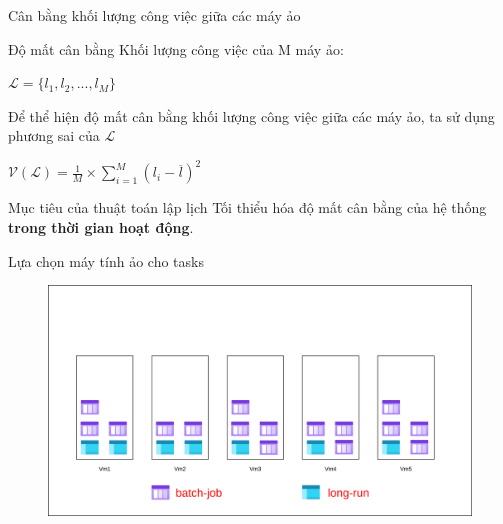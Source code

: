 \documentclass[11pt,xcolor={dvipsnames}, aspectratio=169]{beamer}
\begin{document}
\begin{frame}
{Cân bằng khối lượng công việc giữa các máy ảo}
\pause
\begin{block}
{Độ mất cân bằng}
Khối lượng công việc của M máy ảo: 
\begin{center}
	$\mathcal{L} = \{l_{1}, l_{2}, ..., l_{M}\}$
\end{center}
Để thể hiện độ mất cân bằng khối lượng công việc giữa các máy ảo, ta sử dụng phương sai của $\mathcal{L}$
\begin{center}
	$\mathcal{V}(\mathcal{L}) = \frac{1}{M} \times \sum_{i = 1}^{M}(l_{i} - \overline{l})^{2}$
\end{center}
\end{block}
\begin{block}
{Mục tiêu của thuật toán lập lịch}
Tối thiểu hóa độ mất cân bằng của hệ thống \textbf{trong thời gian hoạt động}.
\end{block}
\end{frame}

\begin{frame}
{Lựa chọn máy tính ảo cho tasks}
	\begin{figure}
		\vspace{1cm}
		\includegraphics[scale=0.4]{images/balancing_tasks1.png}
	\end{figure}
\end{frame}
\end{document}
